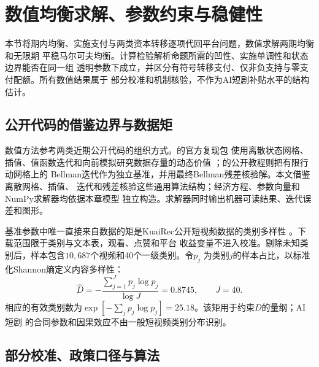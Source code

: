 \documentclass[UTF8, a4paper, 12pt, fontset=fandol]{ctexart}
\theoremstyle{definition}
\theoremstyle{remark}
\begin{document}
\section{数值均衡求解、参数约束与稳健性}
\label{sec:numerical}

本节将期内均衡、实施支付与两类资本转移逐项代回平台问题，数值求解两期均衡和无限期
平稳马尔可夫均衡。计算检验解析命题所需的凹性、实施单调性和状态边界能否在同一组
透明参数下成立，并区分有符号转移支付、仅非负支持与零支付配额。所有数值结果属于
部分校准和机制核验，不作为AI短剧补贴水平的结构估计。

\subsection{公开代码的借鉴边界与数据矩}

数值方法参考两类近期公开代码的组织方式。\citet{farboodi2022data}的官方复现包
使用离散状态网格、插值、值函数迭代和向前模拟研究数据存量的动态价值
\citep{farboodi2026replication}；\citet{yang2025srl}的公开教程则把有限行动网格上的
Bellman迭代作为独立基准，并用最终Bellman残差核验解。本文借鉴离散网格、插值、
迭代和残差核验这些通用算法结构；经济方程、参数向量和NumPy求解器均依据本章模型
独立构造。求解器同时输出机器可读结果、迭代误差和图形。

基准参数中唯一直接来自数据的矩是KuaiRec公开短视频数据的类别多样性
\citep{gao2022kuairec,kuairec2026data}。下载范围限于类别与文本表，观看、点赞和平台
收益变量不进入校准。剔除未知类别后，样本包含$10{,}687$个视频和40个一级类别。令$p_j$
为类别$j$的样本占比，以标准化Shannon熵定义内容多样性：
\begin{equation}
  \widehat D
  =-\frac{\sum_{j=1}^{J}p_j\log p_j}{\log J}
  =0.8745,
  \qquad J=40.
  \label{eq:数值多样性矩}
\end{equation}
相应的有效类别数为$\exp[-\sum_jp_j\log p_j]=25.18$。该矩用于约束$D$的量纲；AI短剧
的合同参数和因果效应不由一般短视频类别分布识别。

\subsection{部分校准、政策口径与算法}
\end{document}
